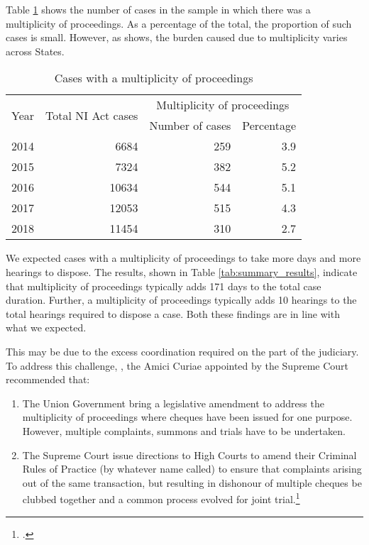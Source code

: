 Table \ref{tab:mult_yearWise} shows the number of cases in the sample in which there was a multiplicity of proceedings. As a percentage of the total, the proportion of such cases is small. However, as  shows, the burden caused due to multiplicity varies across States.

\begin{longtable}[h!]{@{}lrrr@{}}
 \caption{Cases with a multiplicity of proceedings}\label{tab:mult_yearWise}\\
\toprule
\multirow{2}{*}{Year} &  \multirow{2}{*}{Total NI Act cases} & \multicolumn{2}{c}{Multiplicity of proceedings}\\
\cmidrule{3-4}
&& Number of cases & Percentage \\
\midrule\endhead
2014 & 6684 & 259 & 3.9 \\
2015 & 7324 & 382 & 5.2 \\
2016 & 10634 & 544 & 5.1 \\
2017 & 12053 & 515 & 4.3 \\
2018 & 11454 & 310 & 2.7 \\
\bottomrule
\end{longtable}

We expected cases with a multiplicity of proceedings to take more days and more hearings to dispose. The results, shown in Table \ref{tab:summary_results}, indicate that multiplicity of proceedings typically adds 171 days to the total case duration. Further, a multiplicity of proceedings typically adds 10 hearings to the total hearings required to dispose a case. Both these findings are in line with what we expected.

This may be due to the excess coordination required on the part of the judiciary. To address this challenge, , the Amici Curiae appointed by the Supreme Court recommended that:

\begin{enumerate}
 \item The Union Government bring a legislative amendment to address the multiplicity of proceedings where cheques have been issued for one purpose. However, multiple complaints, summons and trials have to be undertaken. 
 \item The Supreme Court issue directions to High Courts to amend their Criminal Rules of Practice (by whatever name called) to ensure that complaints arising out of the same transaction, but resulting in dishonour of multiple cheques be clubbed together and a common process evolved for joint trial.\footcite{amicus2020_submission}
\end{enumerate}

